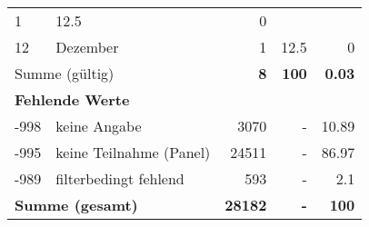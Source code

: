 \begin{longtable}{lXrrr}
       \num{1} &
       \num[round-mode=places,round-precision=2]{12.5} &
         \num[round-mode=places,round-precision=2]{0} \\

     12 &
     \multicolumn{1}{X}{ Dezember   } &


       \num{1} &
       \num[round-mode=places,round-precision=2]{12.5} &
         \num[round-mode=places,round-precision=2]{0} \\
     \midrule
     \multicolumn{2}{l}{Summe (gültig)} &
       \textbf{\num{8}} &
     \textbf{\num{100}} &
       \textbf{\num[round-mode=places,round-precision=2]{0.03}} \\
     \multicolumn{5}{l}{\textbf{Fehlende Werte}}\\
       -998 &
       keine Angabe &
         \num{3070} &
        - &
         \num[round-mode=places,round-precision=2]{10.89} \\
       -995 &
       keine Teilnahme (Panel) &
         \num{24511} &
        - &
         \num[round-mode=places,round-precision=2]{86.97} \\
       -989 &
       filterbedingt fehlend &
         \num{593} &
        - &
         \num[round-mode=places,round-precision=2]{2.1} \\
     \midrule
     \multicolumn{2}{l}{\textbf{Summe (gesamt)}} &
          \textbf{\num{28182}} &
        \textbf{-} &
        \textbf{\num{100}} \\
     \bottomrule
     \end{longtable}
     

